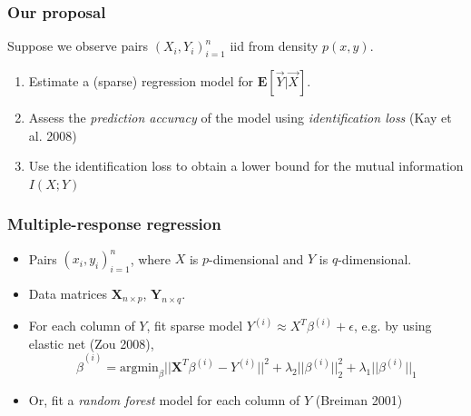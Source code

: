 \documentclass{beamer}
\newcommand{\E}{\textbf{E}}
\newcommand{\bX}{\boldsymbol{X}}
\newcommand{\bY}{\boldsymbol{Y}}
\begin{document}

\begin{frame}
\frametitle{Our proposal}
Suppose we observe pairs $(X_i,Y_i)_{i=1}^n$ iid from density $p(x, y)$.
\begin{enumerate}
\item Estimate a (sparse) regression model for $\E[\vec{Y}|\vec{X}]$.
\item Assess the \emph{prediction accuracy} of the model using \emph{identification loss} (Kay et al. 2008)
\item Use the identification loss to obtain a lower bound for the mutual information $I(X; Y)$
\end{enumerate}
\end{frame}

\begin{frame}
\frametitle{Multiple-response regression}
\begin{itemize}
\item Pairs $(x_i,y_i)_{i=1}^n$, where $X$ is $p$-dimensional and $Y$ is $q$-dimensional.
\item Data matrices $\bX_{n \times p}$, $\bY_{n \times q}$.
\item For each column of $Y$, fit sparse model $Y^{(i)} \approx X^T \beta^{(i)}  + \epsilon$, e.g. by using elastic net (Zou 2008), 
\[
\hat{\beta}^{(i)} = \text{argmin}_\beta ||\bX^T \beta^{(i)} - Y^{(i)}||^2 + \lambda_2 ||\beta^{(i)}||_2^2 + \lambda_1 ||\beta^{(i)}||_1
\]
\item Or, fit a \emph{random forest} model for each column of $Y$ (Breiman 2001)
\end{itemize}
\end{frame}
\end{document}
